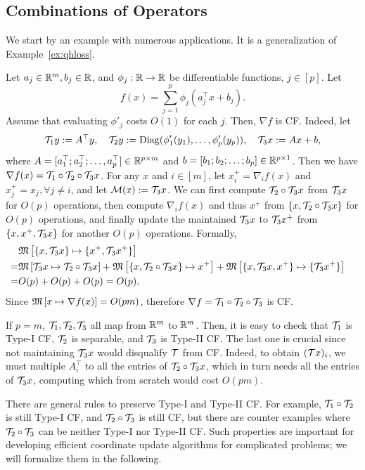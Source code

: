 \subsection{Combinations of Operators}\label{sc:comb}
We start by an example with numerous applications. It is a generalization of Example~\ref{ex:qhloss}.
\begin{example}\label{exp:log-grad} Let $a_j\in \mathbb{R}^m, b_j\in \mathbb{R}$, and $\phi_j:\mathbb{R}\to \mathbb{R}$ be differentiable functions, $j \in [p]$. Let $$f(x)=\sum_{j=1}^p \phi_j(a_j^\top x +b_j).$$ Assume that evaluating $\phi'_j$ costs $O(1)$ for each $j$. Then, $\nabla f$ is CF. Indeed, let $${\mathcal{T}}_1 y:=A^\top y,\quad {\mathcal{T}}_2 y := {\mathrm{Diag}}(\phi_1'(y_1),\ldots,\phi_p'(y_p)), \quad {\mathcal{T}}_3 x := Ax+b,$$ 
where $A=[a_1^\top; a_2^\top; \ldots,a_p^\top]\in \mathbb{R}^{p\times m}$ and $b=[b_1;b_2;\ldots;b_p]\in\mathbb{R}^{p\times 1}$. Then we have $\nabla f(x)= {\mathcal{T}}_1\circ{\mathcal{T}}_2\circ{\mathcal{T}}_3 x$. For any $x$ and $i\in[m]$, let $x^+_i=\nabla_i f(x)$ and $x^+_j=x_j,\forall j\neq i$, and let ${\mathcal{M}}(x):={\mathcal{T}}_3 x$. We can first compute ${\mathcal{T}}_2\circ{\mathcal{T}}_3 x$ from ${\mathcal{T}}_3 x$ for $O(p)$ operations, then compute $\nabla_i f(x)$ and thus $x^+$ from $\{x, {\mathcal{T}}_2\circ{\mathcal{T}}_3 x\}$ for  $O(p)$ operations, and finally update the maintained ${\mathcal{T}}_3 x$ to ${\mathcal{T}}_3 x^+$ from $\{x, x^+,{\mathcal{T}}_3 x\}$ for another $O(p)$ operations. Formally,
\begin{align*}
&\nops{\{x,\cT_3 x\}}{\{x^+, \cT_3x^+\}}\cr
=& \nops{\cT_3x}{\cT_2\circ\cT_3 x}+\nops {\{x,\cT_2\circ\cT_3 x\}}{x^+}+\nops{\{x,\cT_3 x, x^+\}}{\{\cT_3x^+\}}\cr
=& O(p) + O(p) +O(p)=O(p).\nonumber
\end{align*}
Since $\mathfrak{M}\left[{x}\mapsto {\nabla f(x)}\right]=O(pm)$, therefore
$\nabla f= {\mathcal{T}}_1\circ{\mathcal{T}}_2\circ{\mathcal{T}}_3$ is CF. 

If $p=m$, ${\mathcal{T}}_1,{\mathcal{T}}_2,{\mathcal{T}}_3$ all map from $\mathbb{R}^m$ to $\mathbb{R}^m$. Then, it is easy to check that ${\mathcal{T}}_1$ is Type-I CF, ${\mathcal{T}}_2$ is separable, and ${\mathcal{T}}_3$ is Type-II CF. The last one is crucial since not maintaining ${\mathcal{T}}_3 x$ would disqualify ${\mathcal{T}}$ from CF. Indeed, to obtain $({\mathcal{T}} x)_i$, we must multiple $A_i^\top$ to all the entries of ${\mathcal{T}}_2\circ{\mathcal{T}}_3 x$, which in turn needs all the entries of ${\mathcal{T}}_3 x$, computing which from scratch would cost $O(pm)$.

There are general rules to preserve Type-I and Type-II CF. For example, ${\mathcal{T}}_1\circ {\mathcal{T}}_2$ is still Type-I CF, and ${\mathcal{T}}_2\circ{\mathcal{T}}_3$ is still CF, but there are counter examples where  ${\mathcal{T}}_2\circ{\mathcal{T}}_3$  can be neither Type-I nor Type-II CF. Such properties are important for developing efficient coordinate update algorithms for complicated problems; we will formalize them in the following.
\end{example}

